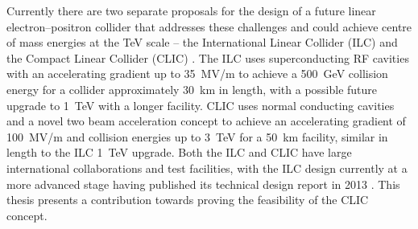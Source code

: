 Currently there are two separate proposals for the design of a future linear electron--positron collider that addresses these challenges and could achieve centre of mass energies at the TeV scale -- the International Linear Collider (ILC) \cite{ILC} and the Compact Linear Collider (CLIC) \cite{clicCDR}. The ILC uses superconducting RF cavities with an accelerating gradient up to 35~MV/m to achieve a 500~GeV collision energy for a collider approximately 30~km in length, with a possible future upgrade to 1~TeV with a longer facility.  CLIC uses normal conducting cavities and a novel two beam acceleration concept to achieve an accelerating gradient of 100~MV/m and collision energies up to 3~TeV for a 50~km facility, similar in length to the ILC 1~TeV upgrade. Both the ILC and CLIC have large international collaborations and test facilities, with the ILC design currently at a more advanced stage having published its technical design report in 2013 \cite{ILC}. This thesis presents a contribution towards proving the feasibility of the CLIC concept.


